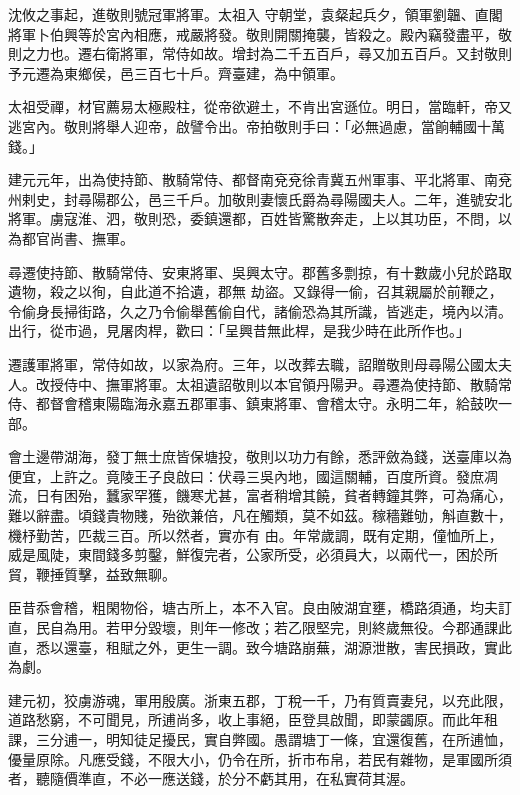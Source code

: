 \begin{pinyinscope}
 沈攸之事起，進敬則號冠軍將軍。太祖入
 守朝堂，袁粲起兵夕，領軍劉韞、直閣將軍卜伯興等於宮內相應，戒嚴將發。敬則開關掩襲，皆殺之。殿內竊發盡平，敬則之力也。遷右衛將軍，常侍如故。增封為二千五百戶，尋又加五百戶。又封敬則予元遷為東鄉侯，邑三百七十戶。齊臺建，為中領軍。



 太祖受禪，材官薦易太極殿柱，從帝欲避土，不肯出宮遜位。明日，當臨軒，帝又逃宮內。敬則將舉人迎帝，啟譬令出。帝拍敬則手曰：「必無過慮，當餉輔國十萬錢。」



 建元元年，出為使持節、散騎常侍、都督南兗兗徐青冀五州軍事、平北將軍、南兗州剌史，封尋陽郡公，邑三千戶。加敬則妻懷氏爵為尋陽國夫人。二年，進號安北將軍。虜寇淮、泗，敬則恐，委鎮還都，百姓皆驚散奔走，上以其功臣，不問，以為都官尚書、撫軍。



 尋遷使持節、散騎常侍、安東將軍、吳興太守。郡舊多剽掠，有十數歲小兒於路取遺物，殺之以徇，自此道不拾遺，郡無
 劫盜。又錄得一偷，召其親屬於前鞭之，令偷身長掃街路，久之乃令偷舉舊偷自代，諸偷恐為其所識，皆逃走，境內以清。出行，從市過，見屠肉桿，歡曰：「呈興昔無此桿，是我少時在此所作也。」



 遷護軍將軍，常侍如故，以家為府。三年，以改葬去職，詔贈敬則母尋陽公國太夫人。改授侍中、撫軍將軍。太祖遺詔敬則以本官領丹陽尹。尋遷為使持節、散騎常侍、都督會稽東陽臨海永嘉五郡軍事、鎮東將軍、會稽太守。永明二年，給鼓吹一部。



 會土邊帶湖海，發丁無士庶皆保塘投，敬則以功力有餘，悉評斂為錢，送臺庫以為便宜，上許之。竟陵王子良啟曰：伏尋三吳內地，國這關輔，百度所資。發庶凋流，日有困殆，蠶家罕獲，饑寒尤甚，富者稍增其饒，貧者轉鐘其弊，可為痛心，難以辭盡。頃錢貴物賤，殆欲兼倍，凡在觸類，莫不如茲。稼穡難劬，斛直數十，機杼勤苦，匹裁三百。所以然者，實亦有
 由。年常歲調，既有定期，僮恤所上，威是風陡，東間錢多剪鑿，鮮復完者，公家所受，必須員大，以兩代一，困於所貿，鞭捶質擊，益致無聊。



 臣昔忝會稽，粗閑物俗，塘古所上，本不入官。良由陂湖宜壅，橋路須通，均夫訂直，民自為用。若甲分毀壞，則年一修改；若乙限堅完，則終歲無役。今郡通課此直，悉以還臺，租賦之外，更生一調。致今塘路崩蕪，湖源泄散，害民損政，實此為劇。



 建元初，狡虜游魂，軍用殷廣。浙東五郡，丁稅一千，乃有質賣妻兒，以充此限，道路愁窮，不可聞見，所逋尚多，收上事絕，臣登具啟聞，即蒙蠲原。而此年租課，三分逋一，明知徒足擾民，實自弊國。愚謂塘丁一條，宜還復舊，在所逋恤，優量原除。凡應受錢，不限大小，仍令在所，折市布帛，若民有雜物，是軍國所須者，聽隨價準直，不必一應送錢，於分不虧其用，在私實荷其渥。




\end{pinyinscope}

